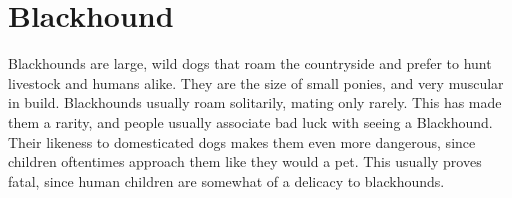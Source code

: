 \section{Blackhound}

Blackhounds are large, wild dogs that roam the countryside and prefer to hunt livestock and humans alike. They are the size of small ponies, and very muscular in build. Blackhounds usually roam solitarily, mating only rarely. This has made them a rarity, and people usually associate bad luck with seeing a Blackhound. Their likeness to domesticated dogs makes them even more dangerous, since children oftentimes approach them like they would a pet. This usually proves fatal, since human children are somewhat of a delicacy to blackhounds.